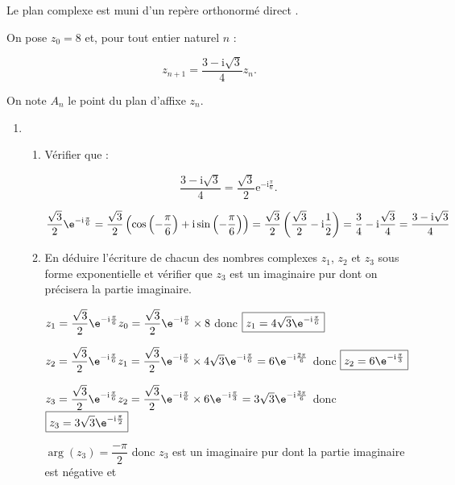 \documentclass{cornouaille}
\begin{document}
\begin{exercice}
Le plan complexe est muni d'un repère orthonormé direct \Ouv.

On pose $z_0 = 8$ et, pour tout entier naturel $n$ :

\[z_{n+1} = \dfrac{3 - \text{i}\sqrt{3}}{4}z_n.\]

On note $A_n$ le point du plan d'affixe $z_n$.

\medskip

\begin{enumerate}
\item 
	\begin{enumerate}
		\item Vérifier que :
		
\[\dfrac{3 - \text{i}\sqrt{3}}{4} = \dfrac{\sqrt{3}}{2}\text{e}^{- \text{i}\frac{\pi}{6}}.\]

\begin{solution}
$\dfrac{\sqrt{3}}{2} \e^{-\text{i} \frac{\pi}{6}} = \dfrac{\sqrt{3}}{2} \left( \cos\left(-\dfrac{\pi}{6}\right) + \text{i}\sin\left(-\dfrac{\pi}{6}\right) \right) = \dfrac{\sqrt{3}}{2} \left( \dfrac{\sqrt{3}}{2} - \text{i}\dfrac{1}{2} \right) = \dfrac{3}{4} - \text{i} \dfrac{\sqrt{3}}{4} = \dfrac{3-\text{i}\sqrt{3}}{4}$
\end{solution}		
		\item En déduire l'écriture de chacun des nombres complexes $z_1$,  $z_2$ et $z_3$ sous forme exponentielle et vérifier que $z_3$ est un imaginaire pur dont on précisera la partie imaginaire.
		
\begin{solution}
$z_1=\dfrac{\sqrt{3}}{2} \e^{-\text{i} \frac{\pi}{6}}z_0=\dfrac{\sqrt{3}}{2} \e^{-\text{i} \frac{\pi}{6}} \times 8$ donc $\boxed{ z_1=4\sqrt{3} \e^{-\text{i} \frac{\pi}{6}} }$\smallskip 
	
	$z_2=\dfrac{\sqrt{3}}{2} \e^{-\text{i} \frac{\pi}{6}}z_1 = \dfrac{\sqrt{3}}{2} \e^{-\text{i} \frac{\pi}{6}} \times 4\sqrt{3} \e^{-\text{i} \frac{\pi}{6}} = 6 \e^{-\text{i} \frac{2\pi}{6}}$ donc $\boxed{ z_2=6 \e^{-\text{i} \frac{\pi}{3}} }$\smallskip 
	
	$z_3=\dfrac{\sqrt{3}}{2} \e^{-\text{i} \frac{\pi}{6}}z_2 = \dfrac{\sqrt{3}}{2} \e^{-\text{i} \frac{\pi}{6}} \times 6 \e^{-\text{i} \frac{\pi}{3}} = 3\sqrt{3} \e^{-\text{i} \frac{3\pi}{6}}$ donc $\boxed{ z_3=3\sqrt{3} \e^{-\text{i} \frac{\pi}{2}} }$\medskip 
	
	$\arg(z_3) = \dfrac{-\pi}{2}$ donc $z_3$ est un imaginaire pur dont la partie imaginaire est négative et 
	

\end{solution}
\end{enumerate}
\end{enumerate}
\end{exercice}
\end{document}
